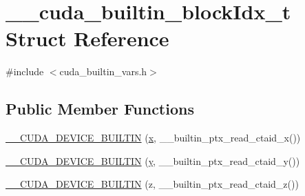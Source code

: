 \hypertarget{struct____cuda__builtin__blockIdx__t}{\section{\-\_\-\-\_\-cuda\-\_\-builtin\-\_\-block\-Idx\-\_\-t Struct Reference}
\label{struct____cuda__builtin__blockIdx__t}
}


{\ttfamily \#include $<$cuda\-\_\-builtin\-\_\-vars.\-h$>$}

\subsection*{Public Member Functions}
\begin{DoxyCompactItemize}
\item 
\hyperlink{struct____cuda__builtin__blockIdx__t_a76b4108e97c9a3bc928635cdbbbc07ec}{\-\_\-\-\_\-\-C\-U\-D\-A\-\_\-\-D\-E\-V\-I\-C\-E\-\_\-\-B\-U\-I\-L\-T\-I\-N} (\hyperlink{OWGeneric__SensorStation_8ino_ad0da36b2558901e21e7a30f6c227a45e}{x}, \-\_\-\-\_\-builtin\-\_\-ptx\-\_\-read\-\_\-ctaid\-\_\-x())
\item 
\hyperlink{struct____cuda__builtin__blockIdx__t_a05e47875502d15df85b5c6a4fe100370}{\-\_\-\-\_\-\-C\-U\-D\-A\-\_\-\-D\-E\-V\-I\-C\-E\-\_\-\-B\-U\-I\-L\-T\-I\-N} (\hyperlink{OWGeneric__SensorStation_8ino_aa4f0d3eebc3c443f9be81bf48561a217}{y}, \-\_\-\-\_\-builtin\-\_\-ptx\-\_\-read\-\_\-ctaid\-\_\-y())
\item 
\hyperlink{struct____cuda__builtin__blockIdx__t_a7bdf9941b72bf61ac4a75c4233cbef85}{\-\_\-\-\_\-\-C\-U\-D\-A\-\_\-\-D\-E\-V\-I\-C\-E\-\_\-\-B\-U\-I\-L\-T\-I\-N} (z, \-\_\-\-\_\-builtin\-\_\-ptx\-\_\-read\-\_\-ctaid\-\_\-z())
\end{DoxyCompactItemize}


